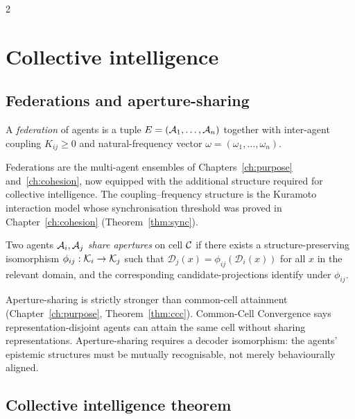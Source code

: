 \begin{multicols}{2}

\section{Collective intelligence}
\label{sec:ch05-collective}

\subsection{Federations and aperture-sharing}

\begin{definition}[Federation]\label{def:ch05-federation}
A \emph{federation} of agents is a tuple
$E = (\mathcal{A}_1, \ldots, \mathcal{A}_n)$ together with inter-agent coupling $K_{ij} \ge 0$
and natural-frequency vector $\omega = (\omega_1, \ldots, \omega_n)$.
\end{definition}

Federations are the multi-agent ensembles of Chapters~\ref{ch:purpose}
and~\ref{ch:cohesion}, now equipped with the additional structure required for collective
intelligence. The coupling--frequency structure is the Kuramoto interaction model whose
synchronisation threshold was proved in Chapter~\ref{ch:cohesion} (Theorem~\ref{thm:sync}).

\begin{definition}\label{def:ch05-apsiso}
Two agents $\mathcal{A}_i, \mathcal{A}_j$ \emph{share apertures} on cell $\mathcal{C}$ if there exists
a structure-preserving isomorphism $\phi_{ij}: \mathcal{K}_i \to \mathcal{K}_j$ such that
$\mathcal{D}_j(x) = \phi_{ij}(\mathcal{D}_i(x))$ for all $x$ in the relevant domain,
and the corresponding candidate-projections identify under $\phi_{ij}$.
\end{definition}

Aperture-sharing is strictly stronger than common-cell attainment
(Chapter~\ref{ch:purpose}, Theorem~\ref{thm:ccc}). Common-Cell Convergence says
representation-disjoint agents can attain the same cell without sharing representations.
Aperture-sharing requires a decoder isomorphism: the agents' epistemic structures must
be mutually recognisable, not merely behaviourally aligned.

\subsection{Collective intelligence theorem}


\end{multicols}
